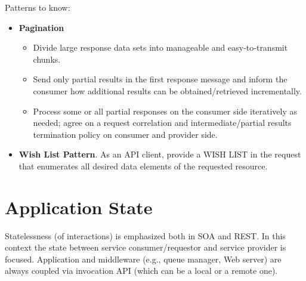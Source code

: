 \documentclass[../Main.tex]{subfiles}
\begin{document}
Patterns to know:
\begin{itemize}
    \item \textbf{Pagination}
    \begin{itemize}
        \item  Divide large response data sets into manageable and easy-to-transmit chunks.
        \item Send only partial results in the first response message and inform the consumer how 
        additional results can be obtained/retrieved incrementally. 
        \item Process some or all partial responses on the consumer side iteratively as needed; agree 
        on a request correlation and intermediate/partial results termination policy on consumer 
        and provider side.
    \end{itemize}
    \item \textbf{Wish List Pattern}. As an API client, provide a WISH LIST in the request that enumerates all desired data elements 
    of the requested resource.
\end{itemize}

\section{Application State}
Statelessness (of interactions) is emphasized both in SOA and REST.
In this context the state between service consumer/requestor and service provider is focused.
Application and middleware (e.g., queue manager, Web server) are always coupled via invocation API (which can be a local or a remote one).

\end{document}

